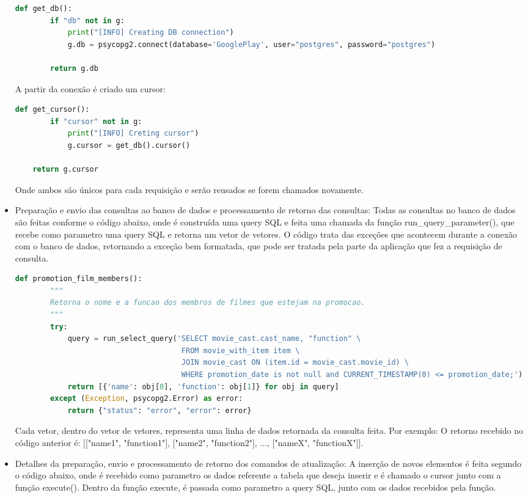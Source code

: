 \documentclass[a4paper, 11pt]{article}
\begin{document}
\begin{itemize}
    \begin{lstlisting}[language=Python]
    def get_db():
        if "db" not in g:
            print("[INFO] Creating DB connection")
            g.db = psycopg2.connect(database='GooglePlay', user="postgres", password="postgres")

        return g.db
    \end{lstlisting}
    A partir da conexão é criado um cursor:
    \begin{lstlisting}[language=Python]
    def get_cursor():
        if "cursor" not in g:
            print("[INFO] Creting cursor")
            g.cursor = get_db().cursor()

    return g.cursor
    \end{lstlisting}
    Onde ambos são únicos para cada requisição e serão reusados se forem chamados novamente.
    \item Preparação e envio das consultas ao banco de dados  e processamento de retorno das consultas: Todas as consultas no banco de dados são feitas conforme o código abaixo, onde é construída uma query SQL e feita uma chamada da função run\_query\_parameter(), que recebe como parametro uma query SQL e retorna um vetor de vetores.
    O código trata das exceções que acontecem durante a conexão com o banco de dados, retornando a exceção bem formatada, que pode ser tratada pela parte da aplicação que fez a requisição de consulta.
    \begin{lstlisting}[language=Python]
    def promotion_film_members():
        """
        Retorna o nome e a funcao dos membros de filmes que estejam na promocao. 
        """
        try:
            query = run_select_query('SELECT movie_cast.cast_name, "function" \
                                      FROM movie_with_item item \
                                      JOIN movie_cast ON (item.id = movie_cast.movie_id) \
                                      WHERE promotion_date is not null and CURRENT_TIMESTAMP(0) <= promotion_date;')
            return [{'name': obj[0], 'function': obj[1]} for obj in query]
        except (Exception, psycopg2.Error) as error:
            return {"status": "error", "error": error}
    \end{lstlisting}
    Cada vetor, dentro do vetor de vetores, representa uma linha de dados retornada da consulta feita.
    Por exemplo: O retorno recebido no código anterior é:
    [["name1", "function1"], ["name2", "function2"], ..., ["nameX", "functionX"]].
    \item Detalhes da preparação, envio e processamento de retorno dos comandos de atualização: A inserção de novos elementos é feita segundo o código abaixo, onde é recebido como parametro os dados referente a tabela que deseja inserir e é chamado o cursor junto com a função execute(). Dentro da função execute, é passada como parametro a query SQL, junto com os dados recebidos pela função. 

\end{itemize}
\end{document}
